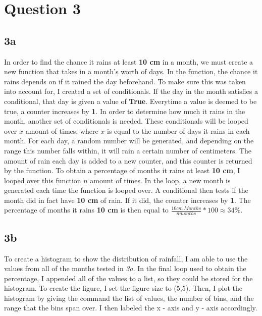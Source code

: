 \documentclass[twocolumn]{revtex4}
\begin{document}
\section{Question 3}



\subsection{3a} 

In order to find the chance it rains at least \textbf{10 cm} in a month, we must create a new function that takes in a month's worth of days.   In the function, the chance it rains depends on if it rained the day beforehand.  To make sure this was taken into account for, I created a set of conditionals.  If the day in the month satisfies a conditional, that day is given a value of \textbf{True}.  Everytime a value is deemed to be true, a counter increases by \textbf{1}.  In order to determine how much it rains in the month, another set of conditionals is needed.  These conditionals will be looped over $x$ amount of times, where $x$ is equal to the number of days it rains in each month.  For each day, a random number will be generated, and depending on the range this number falls within, it will rain a certain number of centimeters.  The amount of rain each day is added to a new counter, and this counter is returned by the function.  To obtain a percentage of months it rains at least \textbf{10 cm}, I looped over this function $n$ amount of times.  In the loop, a new month is generated each time the function is looped over.  A conditional then tests if the month did in fact have \textbf{10 cm} of rain.  If it did, the counter increases by \textbf{1}.  The percentage of months it rains \textbf{10 cm} is then equal to $ \frac{10cm~Months}{nmonths} * 100 \approx 34 \% $.

\subsection{3b}

To create a histogram to show the distribution of rainfall, I am able to use the values from all of the months tested in \textit{3a}.  In the final loop used to obtain the percentage, I appended all of the values to a list, so they could be stored for the histogram.   To create the figure, I set the figure size to (5,5).  Then, I plot the histogram by giving the command the list of values, the number of bins, and the range that the bins span over.  I then labeled the x - axis and y - axis accordingly.
\end{document}
